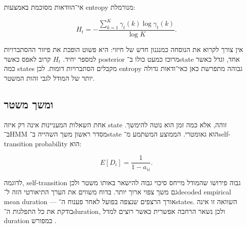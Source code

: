 אי־הוודאות מסוכמת באמצעות entropy מנורמלת:

\begin{equation}
H_t=-\frac{\sum_{k=1}^{K}\gamma_t(k)\log\gamma_t(k)}{\log K}.
\end{equation}

אין צורך לקרוא את הנוסחה כמנגנון חדש של חיזוי: היא פשוט הופכת את פיזור ההסתברויות למספר יחיד. \(H_t\) קרוב לאפס כאשר posterior מרוכז כמעט כולו ב־state אחד, וגדל כאשר כמה states מקבלים הסתברויות דומות. לכן entropy גבוהה מתפרשת כאן כאי־ודאות גדולה יותר של המודל לגבי זהות המשטר.

\subsection{ ומשך משטר}

אחת השאלות המעניינות אינה רק איזה state זוהה, אלא כמה זמן הוא נוטה להימשך. ב־HMM מסדר ראשון משך השהייה ב־state הוא גאומטרי. הממוצע המשתמע מ־self-transition probability הוא:

\begin{equation}
E[D_i]=\frac{1}{1-a_{ii}}.
\end{equation}

לדוגמה, self-transition גבוה פירושו שהמודל מייחס סיכוי גבוה להישאר באותו משטר ולכן גם משך צפוי ארוך יותר. בדוח משווים את הערך התיאורטי הזה ל־decoded empirical mean duration — אורך הרצפים שנצפה בפועל לאחר פענוח ה־states. השוואה זו אינה בודקת את כל התפלגות ה־duration, ולכן  נשאר הרחבה אפשרית כאשר רוצים למדל duration במפורש \cite{bulla2006application}.
